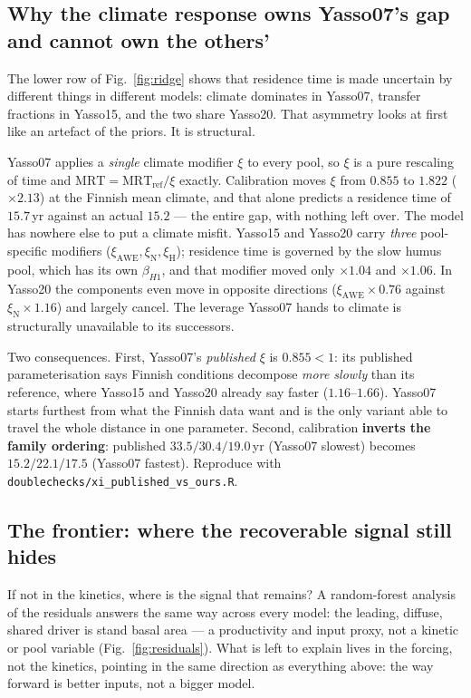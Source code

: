 \documentclass[11pt]{article}
\begin{document}
\subsection{Why the climate response owns Yasso07's gap and cannot own the others'}
The lower row of Fig.~\ref{fig:ridge} shows that residence time is made uncertain by different things
in different models: climate dominates in Yasso07, transfer fractions in Yasso15, and the two share
Yasso20. That asymmetry looks at first like an artefact of the priors. It is structural.

Yasso07 applies a \emph{single} climate modifier $\xi$ to every pool, so $\xi$ is a pure rescaling of
time and $\mathrm{MRT}=\mathrm{MRT}_{\mathrm{ref}}/\xi$ exactly. Calibration moves $\xi$ from $0.855$
to $1.822$ ($\times2.13$) at the Finnish mean climate, and that alone predicts a residence time of
$15.7$\,yr against an actual $15.2$ --- the entire gap, with nothing left over. The model has nowhere
else to put a climate misfit. Yasso15 and Yasso20 carry \emph{three} pool-specific modifiers
($\xi_{\mathrm{AWE}},\xi_{\mathrm{N}},\xi_{\mathrm{H}}$); residence time is governed by the slow
humus pool, which has its own $\beta_{H1}$, and that modifier moved only $\times1.04$ and $\times1.06$.
In Yasso20 the components even move in opposite directions ($\xi_{\mathrm{AWE}}\times0.76$ against
$\xi_{\mathrm{N}}\times1.16$) and largely cancel. The leverage Yasso07 hands to climate is
structurally unavailable to its successors.

Two consequences. First, Yasso07's \emph{published} $\xi$ is $0.855<1$: its published parameterisation
says Finnish conditions decompose \emph{more slowly} than its reference, where Yasso15 and Yasso20
already say faster ($1.16$--$1.66$). Yasso07 starts furthest from what the Finnish data want and is the
only variant able to travel the whole distance in one parameter. Second, calibration \textbf{inverts
the family ordering}: published $33.5/30.4/19.0$\,yr (Yasso07 slowest) becomes $15.2/22.1/17.5$
(Yasso07 fastest). Reproduce with \texttt{doublechecks/xi\_published\_vs\_ours.R}.

\subsection{The frontier: where the recoverable signal still hides}
If not in the kinetics, where is the signal that remains? A random-forest analysis of the residuals answers the
same way across every model: the leading, diffuse, shared driver is stand basal area --- a productivity and input
proxy, not a kinetic or pool variable (Fig.~\ref{fig:residuals}). What is left to explain lives in the forcing, not
the kinetics, pointing in the same direction as everything above: the way forward is better inputs, not a bigger
model.
\end{document}
